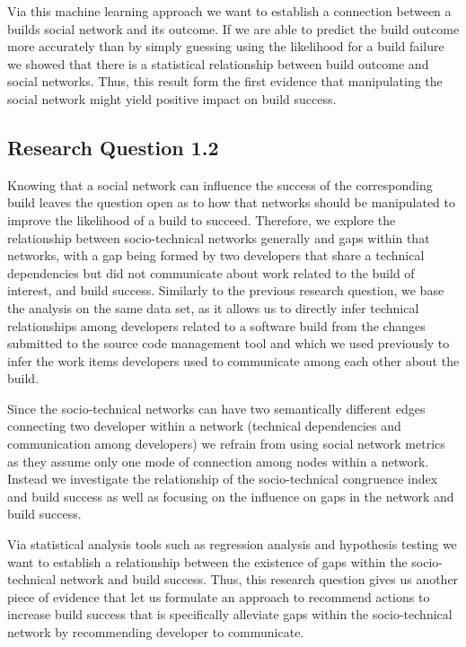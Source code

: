 Via this machine learning approach we want to establish a connection between a builds social network and its outcome. 
If we are able to predict the build outcome more accurately than by simply guessing using the likelihood for a build failure we showed that there is a statistical relationship between build outcome and social networks.
Thus, this result form the first evidence that manipulating the social network might yield positive impact on build success.

\subsection{Research Question 1.2}
Knowing that a social network can influence the success of the corresponding build leaves the question open as to how that networks should be manipulated to improve the likelihood of a build to succeed.
Therefore, we explore the relationship between socio-technical networks generally and gaps within that networks, with a gap being formed by two developers that share a technical dependencies but did not communicate about work related to the build of interest, and build success.
Similarly to the previous research question, we base the analysis on the same data set, as it allows us to directly infer technical relationships among developers related to a software build from the changes submitted to the source code management tool and which we used previously to infer the work items developers used to communicate among each other about the build.

Since the socio-technical networks can have two semantically different edges connecting two developer within a network (technical dependencies and communication among developers) we refrain from using social network metrics as they assume only one mode of connection among nodes within a network.
Instead we investigate the relationship of the socio-technical congruence index and build success as well as focusing on the influence on gaps in the network and build success.

Via statistical analysis tools such as regression analysis and hypothesis testing we want to establish a relationship between the existence of gaps within the socio-technical network and build success.
Thus, this research question gives us another piece of evidence that let us formulate an approach to recommend actions to increase build success that is specifically alleviate gaps within the socio-technical network by recommending developer to communicate.

